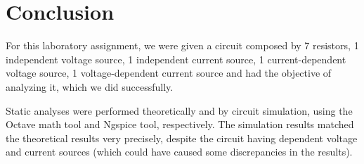 \section{Conclusion}
\label{sec:conclusion}


For this laboratory assignment, we were given a circuit composed by 7 resistors, 1 
independent voltage source, 1 independent current source, 1 current-dependent voltage
source, 1 voltage-dependent current source and had the objective of analyzing it, which
we did successfully. 

Static analyses were performed theoretically and by circuit simulation,
using the Octave math tool and Ngspice tool, respectively. The simulation results matched
the theoretical results very precisely, despite the circuit having dependent voltage and
current sources (which could have caused some discrepancies in the results).

